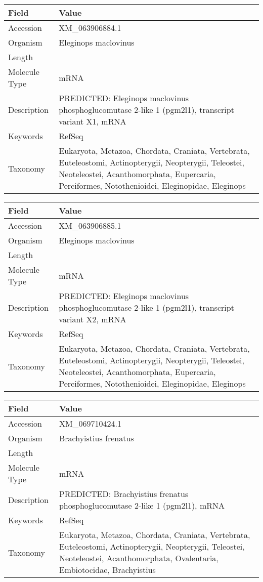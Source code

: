 \documentclass[10pt]{article}
\begin{document}
\vspace{1em}
{\footnotesize
\begin{longtable}{>{\raggedright\arraybackslash}p{4.5cm} >{\raggedright\arraybackslash}p{11.5cm}}
\textbf{Field} & \textbf{Value} \\
\hline
Accession & XM\_063906884.1 \\
Organism & Eleginops maclovinus \\
Length & 3012 \\
Molecule Type & mRNA \\
Description & PREDICTED: Eleginops maclovinus phosphoglucomutase 2-like 1 (pgm2l1), transcript variant X1, mRNA \\
Keywords & RefSeq \\
Taxonomy & Eukaryota, Metazoa, Chordata, Craniata, Vertebrata, Euteleostomi, Actinopterygii, Neopterygii, Teleostei, Neoteleostei, Acanthomorphata, Eupercaria, Perciformes, Notothenioidei, Eleginopidae, Eleginops \\
\end{longtable}
}

\vspace{1em}
{\footnotesize
\begin{longtable}{>{\raggedright\arraybackslash}p{4.5cm} >{\raggedright\arraybackslash}p{11.5cm}}
\textbf{Field} & \textbf{Value} \\
\hline
Accession & XM\_063906885.1 \\
Organism & Eleginops maclovinus \\
Length & 2883 \\
Molecule Type & mRNA \\
Description & PREDICTED: Eleginops maclovinus phosphoglucomutase 2-like 1 (pgm2l1), transcript variant X2, mRNA \\
Keywords & RefSeq \\
Taxonomy & Eukaryota, Metazoa, Chordata, Craniata, Vertebrata, Euteleostomi, Actinopterygii, Neopterygii, Teleostei, Neoteleostei, Acanthomorphata, Eupercaria, Perciformes, Notothenioidei, Eleginopidae, Eleginops \\
\end{longtable}
}

\vspace{1em}
{\footnotesize
\begin{longtable}{>{\raggedright\arraybackslash}p{4.5cm} >{\raggedright\arraybackslash}p{11.5cm}}
\textbf{Field} & \textbf{Value} \\
\hline
Accession & XM\_069710424.1 \\
Organism & Brachyistius frenatus \\
Length & 2823 \\
Molecule Type & mRNA \\
Description & PREDICTED: Brachyistius frenatus phosphoglucomutase 2-like 1 (pgm2l1), mRNA \\
Keywords & RefSeq \\
Taxonomy & Eukaryota, Metazoa, Chordata, Craniata, Vertebrata, Euteleostomi, Actinopterygii, Neopterygii, Teleostei, Neoteleostei, Acanthomorphata, Ovalentaria, Embiotocidae, Brachyistius \\
\end{longtable}
}
\end{document}
